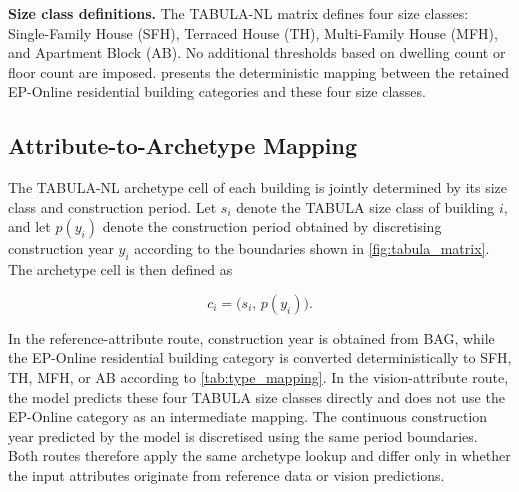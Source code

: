 \textbf{Size class definitions.}
The TABULA-NL matrix defines four size classes: Single-Family House (SFH), Terraced House (TH), Multi-Family House (MFH), and Apartment Block (AB).
No additional thresholds based on dwelling count or floor count are imposed.
 presents the deterministic mapping between the retained EP-Online residential building categories and these four size classes.

\subsection{Attribute-to-Archetype Mapping}
\label{sec:attribute_archetype_mapping}

The TABULA-NL archetype cell of each building is jointly determined by its size class and construction period.
Let $s_i$ denote the TABULA size class of building $i$, and let $p(y_i)$ denote the construction period obtained by discretising construction year $y_i$ according to the boundaries shown in \cref{fig:tabula_matrix}.
The archetype cell is then defined as

\begin{equation}
	\label{eq:archetype_cell}
	c_i = \bigl(s_i,\, p(y_i)\bigr).
\end{equation}

In the reference-attribute route, construction year is obtained from BAG, while the EP-Online residential building category is converted deterministically to SFH, TH, MFH, or AB according to \cref{tab:type_mapping}.
In the vision-attribute route, the model predicts these four TABULA size classes directly and does not use the EP-Online category as an intermediate mapping.
The continuous construction year predicted by the model is discretised using the same period boundaries.
Both routes therefore apply the same archetype lookup and differ only in whether the input attributes originate from reference data or vision predictions.

